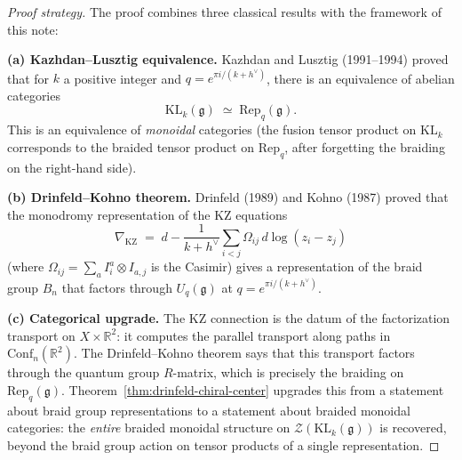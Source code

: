\documentclass[11pt]{article}
\theoremstyle{definition}
\theoremstyle{remark}
\newcommand{\Rep}{\mathrm{Rep}}
\newcommand{\Uq}{U_q}
\newcommand{\cZ}{\mathcal{Z}}
\newcommand{\frakg}{\mathfrak{g}}
\newcommand{\KL}{\mathrm{KL}}
\newcommand{\Conf}{\mathrm{Conf}}
\begin{document}
\begin{proof}[Proof strategy]
The proof combines three classical results with the framework of this note:

\smallskip\noindent\textbf{(a) Kazhdan--Lusztig equivalence.} Kazhdan and Lusztig (1991--1994) proved that for $k$ a positive integer and $q = e^{\pi i / (k + h^\vee)}$, there is an equivalence of abelian categories
\[
 \KL_k(\frakg) \;\simeq\; \Rep_q(\frakg).
\]
This is an equivalence of \emph{monoidal} categories (the fusion tensor product on $\KL_k$ corresponds to the braided tensor product on $\Rep_q$, after forgetting the braiding on the right-hand side).

\smallskip\noindent\textbf{(b) Drinfeld--Kohno theorem.} Drinfeld (1989) and Kohno (1987) proved that the monodromy representation of the KZ equations
\[
 \nabla_{\mathrm{KZ}} \;=\; d - \frac{1}{k + h^\vee} \sum_{i < j} \Omega_{ij}\, d\log(z_i - z_j)
\]
(where $\Omega_{ij} = \sum_a I^a_i \otimes I_{a,j}$ is the Casimir) gives a representation of the braid group $B_n$ that factors through $\Uq(\frakg)$ at $q = e^{\pi i / (k + h^\vee)}$.

\smallskip\noindent\textbf{(c) Categorical upgrade.} The KZ connection is the datum of the factorization transport on $X \times \mathbb{R}^2$: it computes the parallel transport along paths in $\Conf_n(\mathbb{R}^2)$. The Drinfeld--Kohno theorem says that this transport factors through the quantum group $R$-matrix, which is precisely the braiding on $\Rep_q(\frakg)$. Theorem~\ref{thm:drinfeld-chiral-center} upgrades this from a statement about braid group representations to a statement about braided monoidal categories: the \emph{entire} braided monoidal structure on $\cZ(\KL_k(\frakg))$ is recovered, beyond the braid group action on tensor products of a single representation.


\end{proof}
\end{document}
